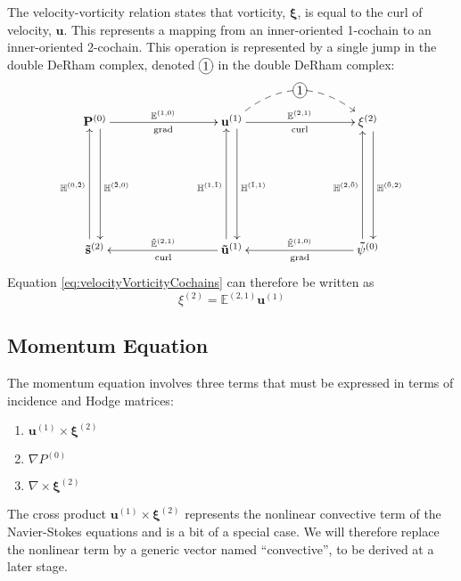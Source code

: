 The velocity-vorticity relation states that vorticity, $\mathbf{\xi}$, is equal to the curl of velocity, $\mathbf{u}$. This represents a mapping from an inner-oriented 1-cochain to an inner-oriented 2-cochain. This operation is represented by a single jump in the double DeRham complex, denoted $\xymatrix{*+[o][F-]{1}}$ in the double DeRham complex:
\begin{equation}
    \begin{gathered}
        \xymatrix@=20ex{
            \mathbf{P}^{(0)} \ar[r]^{\mathbb{E}^{(1,0)}}_{\text{grad}} \ar@<1ex>[d]^{\mathbb{H}^{(\tilde{2},0)}} & \mathbf{u}^{(1)} \ar[r]^{\mathbb{E}^{(2,1)}}_{\text{curl}} \ar @/^6ex/ @{-->} [r]|-*+[o][F-]{1} \ar@<1ex>[d]^{\mathbb{H}^{(\tilde{1},1)}} & \mathbf{\xi}^{(2)} \ar@<1ex>[d]^{\mathbb{H}^{(\tilde{0},2)}} \\
            \mathbf{\tilde{s}}^{(2)} \ar@<1ex>[u]^{\mathbb{H}^{(0,\tilde{2})}} & \mathbf{\tilde{u}}^{(1)} \ar[l]_{\tilde{\mathbb{E}}^{(2, 1)}}^{\text{curl}} \ar@<1ex>[u]^{\mathbb{H}^{(1,\tilde{1})}} & \mathbf{\tilde{\psi}}^{(0)} \ar[l]_{\tilde{\mathbb{E}}^{(1,0)}}^{\text{grad}} \ar@<1ex>[u]^{\mathbb{H}^{(2,\tilde{0})}}
        }
    \end{gathered}
    \label{eq:DeRhamVelocityVorticity}
\end{equation}
Equation \ref{eq:velocityVorticityCochains} can therefore be written as
\begin{equation}
    \xi^{(2)} = \mathbb{E}^{(2,1)} \mathbf{u}^{(1)}
\end{equation}

\subsection{Momentum Equation}

The momentum equation involves three terms that must be expressed in terms of incidence and Hodge matrices:
\begin{enumerate}
    \item $\mathbf{u}^{(1)} \times \mathbf{\xi}^{(2)}$
    \item $\nabla P^{(0)}$
    \item $\nabla \times \mathbf{\xi}^{(2)}$
\end{enumerate}


The cross product $\mathbf{u}^{(1)} \times \mathbf{\xi}^{(2)}$ represents the nonlinear convective term of the Navier-Stokes equations and is a bit of a special case. We will therefore replace the nonlinear term by a generic vector named ``convective'', to be derived at a later stage.


